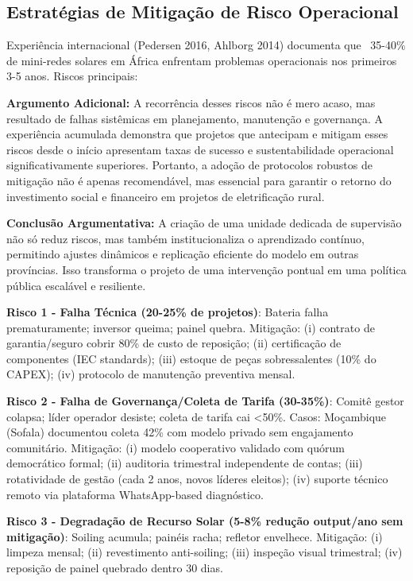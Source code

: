 \documentclass[12pt, a4paper]{article}
\begin{document}
\subsection{Estratégias de Mitigação de Risco Operacional}

Experiência internacional (Pedersen 2016, Ahlborg 2014) documenta que ~35-40\% de mini-redes solares em África enfrentam problemas operacionais nos primeiros 3-5 anos. Riscos principais:

\textbf{Argumento Adicional:} A recorrência desses riscos não é mero acaso, mas resultado de falhas sistêmicas em planejamento, manutenção e governança. A experiência acumulada demonstra que projetos que antecipam e mitigam esses riscos desde o início apresentam taxas de sucesso e sustentabilidade operacional significativamente superiores. Portanto, a adoção de protocolos robustos de mitigação não é apenas recomendável, mas essencial para garantir o retorno do investimento social e financeiro em projetos de eletrificação rural.

\textbf{Conclusão Argumentativa:} A criação de uma unidade dedicada de supervisão não só reduz riscos, mas também institucionaliza o aprendizado contínuo, permitindo ajustes dinâmicos e replicação eficiente do modelo em outras províncias. Isso transforma o projeto de uma intervenção pontual em uma política pública escalável e resiliente.

\textbf{Risco 1 - Falha Técnica (20-25\% de projetos)}: Bateria falha prematuramente; inversor queima; painel quebra. Mitigação: (i) contrato de garantia/seguro cobrir 80\% de custo de reposição; (ii) certificação de componentes (IEC standards); (iii) estoque de peças sobressalentes (10\% do CAPEX); (iv) protocolo de manutenção preventiva mensal.

\textbf{Risco 2 - Falha de Governança/Coleta de Tarifa (30-35\%)}: Comitê gestor colapsa; líder operador desiste; coleta de tarifa cai <50\%. Casos: Moçambique (Sofala) documentou coleta 42\% com modelo privado sem engajamento comunitário. Mitigação: (i) modelo cooperativo validado com quórum democrático formal; (ii) auditoria trimestral independente de contas; (iii) rotatividade de gestão (cada 2 anos, novos líderes eleitos); (iv) suporte técnico remoto via plataforma WhatsApp-based diagnóstico.

\textbf{Risco 3 - Degradação de Recurso Solar (5-8\% redução output/ano sem mitigação)}: Soiling acumula; painéis racha; refletor envelhece. Mitigação: (i) limpeza mensal; (ii) revestimento anti-soiling; (iii) inspeção visual trimestral; (iv) reposição de painel quebrado dentro 30 dias.
\end{document}
